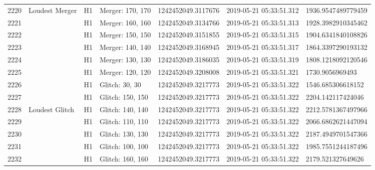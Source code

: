 \begin{longtable}{lllllll}
2220 &                                     Loudest Merger &       H1 &  Merger: 170, 170 &  1242452049.3117676 &  2019-05-21 05:33:51.312 &  1936.9547489779459 \\
2221 &                                                    &       H1 &  Merger: 160, 160 &  1242452049.3134766 &  2019-05-21 05:33:51.313 &  1928.3982910345462 \\
2222 &                                                    &       H1 &  Merger: 150, 150 &  1242452049.3151855 &  2019-05-21 05:33:51.315 &  1904.6341840108826 \\
2223 &                                                    &       H1 &  Merger: 140, 140 &  1242452049.3168945 &  2019-05-21 05:33:51.317 &  1864.3397290193132 \\
2224 &                                                    &       H1 &  Merger: 130, 130 &  1242452049.3186035 &  2019-05-21 05:33:51.319 &  1808.1218092120546 \\
2225 &                                                    &       H1 &  Merger: 120, 120 &  1242452049.3208008 &  2019-05-21 05:33:51.321 &     1730.9056969493 \\
2226 &                                                    &       H1 &    Glitch: 30, 30 &  1242452049.3217773 &  2019-05-21 05:33:51.322 &   1546.685306618152 \\
2227 &                                                    &       H1 &  Glitch: 150, 150 &  1242452049.3217773 &  2019-05-21 05:33:51.322 &   2204.142117424046 \\
2228 &                                     Loudest Glitch &       H1 &  Glitch: 140, 140 &  1242452049.3217773 &  2019-05-21 05:33:51.322 &  2212.5781367497966 \\
2229 &                                                    &       H1 &  Glitch: 110, 110 &  1242452049.3217773 &  2019-05-21 05:33:51.322 &  2066.6862621447094 \\
2230 &                                                    &       H1 &  Glitch: 130, 130 &  1242452049.3217773 &  2019-05-21 05:33:51.322 &  2187.4949701547366 \\
2231 &                                                    &       H1 &  Glitch: 100, 100 &  1242452049.3217773 &  2019-05-21 05:33:51.322 &  1985.7551244187496 \\
2232 &                                                    &       H1 &  Glitch: 160, 160 &  1242452049.3217773 &  2019-05-21 05:33:51.322 &   2179.521327649626 \\

\end{longtable}

